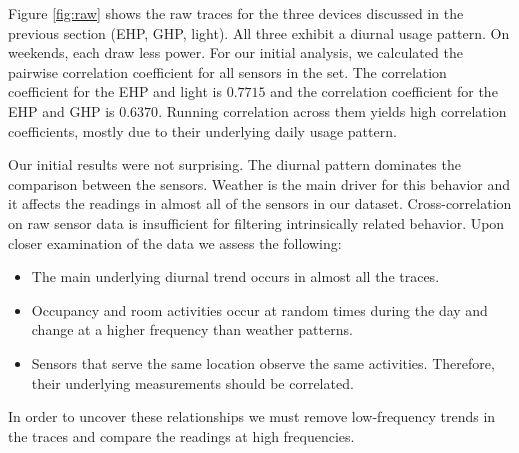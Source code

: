 Figure \ref{fig:raw} shows the raw traces for the three devices discussed in 
the previous section (EHP, GHP, light). All three exhibit a diurnal usage pattern.  On weekends, each
draw less power.   For our initial analysis, we calculated the pairwise 
correlation coefficient for all sensors in the set.  The correlation coefficient for 
 the EHP and light is $0.7715$ and the correlation coefficient for the EHP and GHP is $0.6370$.
Running correlation across them yields high correlation coefficients, mostly
due to their underlying daily usage pattern.




Our initial results were not surprising.  The diurnal pattern dominates the comparison between the sensors.
Weather is the main driver for this behavior and it affects the readings in almost all of the
sensors in our dataset.  Cross-correlation on raw sensor data is insufficient for filtering intrinsically related
behavior.  Upon closer examination of the data we assess the following:

\begin{itemize}
\item The main underlying diurnal trend occurs in almost all the traces.
\item Occupancy and room activities occur at random times during the day and change 
		at a higher frequency than weather patterns.
\item Sensors that serve the same location observe the same activities.  Therefore, their underlying
		measurements should be correlated.
\end{itemize}

In order to uncover these relationships we must remove low-frequency trends in the traces and
compare the readings at high frequencies.

